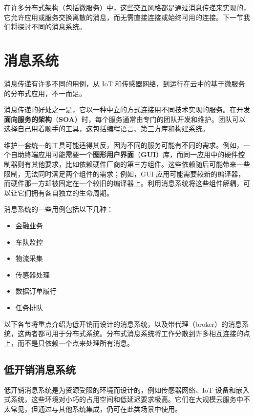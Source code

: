 在许多分布式架构（包括微服务）中，这些交互风格都是通过消息传递来实现的，它允许应用或服务交换离散的消息，而无需直接连接或始终可用的连接。下一节我们将探讨不同的消息系统。

\section{消息系统}

\label{idx:1500}
消息传递有许多不同的用例，从 IoT 和传感器网络，到运行在云中的基于微服务的分布式应用，不一而足。

\label{idx:1501}
消息传递的好处之一是，它以一种中立的方式连接用不同技术实现的服务。在开发\textbf{面向服务的架构}（\textbf{SOA}）时，每个服务通常由专门的团队开发和维护。团队可以选择自己用着顺手的工具，这包括编程语言、第三方库和构建系统。

\label{idx:1502}
维护一套统一的工具可能适得其反，因为不同的服务可能有不同的需求。例如，一个自助终端应用可能需要一个\textbf{图形用户界面}（\textbf{GUI}）库，而同一应用中的硬件控制器则有其他要求，比如依赖硬件厂商的第三方组件。这些依赖随后可能带来一些限制，无法同时满足两个组件的需求；例如，GUI 应用可能需要较新的编译器，而硬件那一方却被固定在一个较旧的编译器上。利用消息系统将这些组件解耦，可以让它们拥有各自独立的生命周期。

消息系统的一些用例包括以下几种：

\begin{itemize}
\item 金融业务
\item 车队监控
\item 物流采集
\item 传感器处理
\item 数据订单履行
\item 任务排队
\end{itemize}

以下各节将重点介绍为低开销而设计的消息系统，以及带代理（broker）的消息系统，这两者都可用于分布式系统。分布式消息系统将工作分散到许多相互连接的点上，而不是只依赖一个点来处理所有消息。

\subsection{低开销消息系统}

\label{idx:1503}
\label{idx:1504}
低开销消息系统是为资源受限的环境而设计的，例如传感器网络、IoT 设备和嵌入式系统，这些环境对小巧的占用空间和低延迟要求极高。它们在大规模云服务中不太常见，但通过与其他系统集成，仍可在此类场景中使用。

